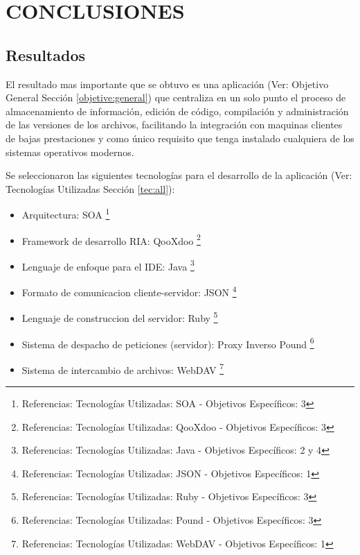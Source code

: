 \section{CONCLUSIONES}

\subsection{Resultados}

El resultado mas importante que se obtuvo es una aplicación (Ver: Objetivo General Sección \ref{objetive:general}) que centraliza en un solo punto el proceso de almacenamiento de información, edición de código, compilación y administración de las versiones de los archivos, facilitando la integración con maquinas clientes de bajas prestaciones y como único requisito que tenga instalado cualquiera de los sistemas operativos modernos.

Se seleccionaron las siguientes tecnologías para el desarrollo de la aplicación (Ver: Tecnologías Utilizadas Sección \ref{tec:all}):

\begin{itemize}
	
	\item Arquitectura: SOA
	\footnote {Referencias: Tecnologías Utilizadas: SOA - Objetivos Específicos: 3}
	
	\item Framework de desarrollo RIA: QooXdoo
	\footnote {Referencias: Tecnologías Utilizadas: QooXdoo - Objetivos Específicos: 3}
	
	\item Lenguaje de enfoque para el IDE: Java
	\footnote {Referencias: Tecnologías Utilizadas: Java - Objetivos Específicos: 2 y 4}
	
	\item Formato de comunicacion cliente-servidor: JSON
	\footnote {Referencias: Tecnologías Utilizadas: JSON - Objetivos Específicos: 1}
	
	\item Lenguaje de construccion del servidor: Ruby
	\footnote {Referencias: Tecnologías Utilizadas: Ruby - Objetivos Específicos: 3}
	
	\item Sistema de despacho de peticiones (servidor): Proxy Inverso Pound
	\footnote {Referencias: Tecnologías Utilizadas: Pound - Objetivos Específicos: 3}
	
	\item Sistema de intercambio de archivos: WebDAV
	\footnote {Referencias: Tecnologías Utilizadas: WebDAV - Objetivos Específicos: 1}
	
\end{itemize}


